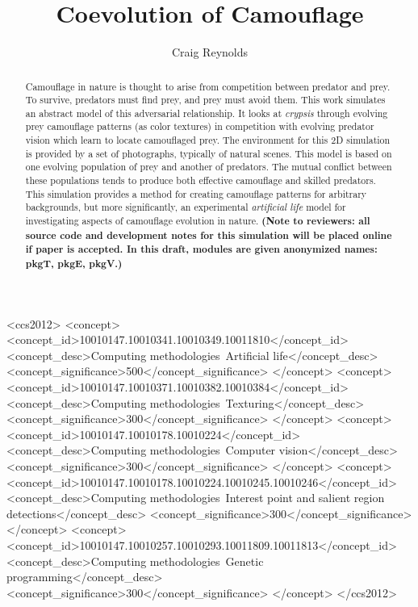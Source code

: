 \documentclass[acmtog]{acmart}
\newcommand{\texsyn}[0]{pkgT}
\newcommand{\lazypredator}[0]{pkgE}
\newcommand{\predatoreye}[0]{pkgV}
\begin{document}
\title{Coevolution of Camouflage}

\author{Craig Reynolds}

\renewcommand{\shortauthors}{Craig Reynolds}


\begin{abstract}
    Camouflage in nature is thought to arise from competition between predator and prey. To survive, predators must find prey, and prey must avoid them. This work simulates an abstract model of this adversarial relationship. It looks at \textit{crypsis} through evolving prey camouflage patterns (as color textures) in competition with evolving predator vision which learn to locate camouflaged prey. The environment for this 2D simulation is provided by a set of photographs, typically of natural scenes. This model is based on one evolving population of prey and another of predators. The mutual conflict between these populations tends to produce both effective camouflage and skilled predators. This simulation provides a method for creating camouflage patterns for arbitrary backgrounds, but more significantly, an experimental \textit{artificial life} model for investigating aspects of camouflage evolution in nature. \textbf{(Note to reviewers: all source code and development notes for this simulation will be placed online if paper is accepted. In this draft, modules are given anonymized names: \texsyn{}, \lazypredator{}, \predatoreye{}.)}
\end{abstract}


\begin{CCSXML}
<ccs2012>
   <concept>
       <concept_id>10010147.10010341.10010349.10011810</concept_id>
       <concept_desc>Computing methodologies~Artificial life</concept_desc>
       <concept_significance>500</concept_significance>
       </concept>
   <concept>
       <concept_id>10010147.10010371.10010382.10010384</concept_id>
       <concept_desc>Computing methodologies~Texturing</concept_desc>
       <concept_significance>300</concept_significance>
       </concept>
   <concept>
       <concept_id>10010147.10010178.10010224</concept_id>
       <concept_desc>Computing methodologies~Computer vision</concept_desc>
       <concept_significance>300</concept_significance>
       </concept>
    <concept>
       <concept_id>10010147.10010178.10010224.10010245.10010246</concept_id>
       <concept_desc>Computing methodologies~Interest point and salient region detections</concept_desc>
       <concept_significance>300</concept_significance>
       </concept>
    <concept>
        <concept_id>10010147.10010257.10010293.10011809.10011813</concept_id>
        <concept_desc>Computing methodologies~Genetic programming</concept_desc>
        <concept_significance>300</concept_significance>
        </concept>
 </ccs2012>
\end{CCSXML}
\end{document}
